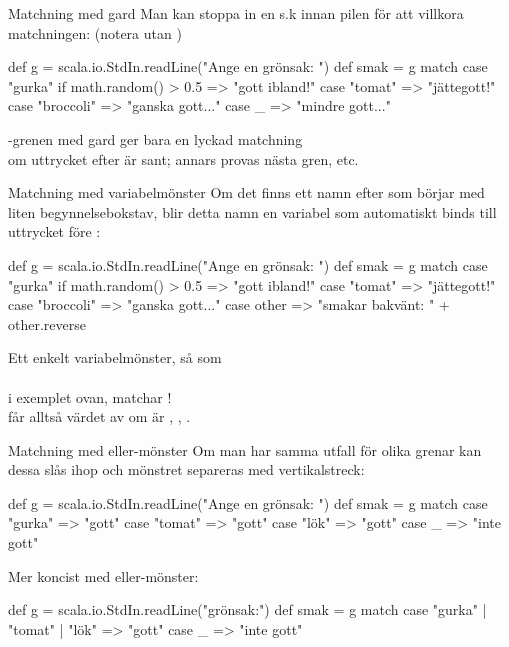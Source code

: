\begin{Slide}{Matchning med gard}
Man kan stoppa in en s.k   innan pilen \code{=>} för att villkora matchningen: (notera  utan )
\begin{Code}
def g = scala.io.StdIn.readLine("Ange en grönsak: ")
def smak = g match 
  case "gurka" if math.random() > 0.5 => "gott ibland!"
  case "tomat" => "jättegott!"
  case "broccoli" => "ganska gott..."
  case _ => "mindre gott..."
\end{Code}
-grenen med gard ger bara en lyckad matchning \\ om uttrycket efter  är sant; annars provas nästa gren, etc.
\end{Slide}

\begin{Slide}{Matchning med variabelmönster}\SlideFontSmall
Om det finns ett namn efter  som börjar med liten begynnelsebokstav, blir detta namn en variabel som automatiskt binds till uttrycket före :

\begin{Code}
def g = scala.io.StdIn.readLine("Ange en grönsak: ")
def smak = g match 
  case "gurka" if math.random() > 0.5 => "gott ibland!"
  case "tomat" => "jättegott!"
  case "broccoli" => "ganska gott..."
  case other => "smakar bakvänt: " + other.reverse
\end{Code}

Ett enkelt variabelmönster, så som \\  \\ i exemplet ovan, matchar ! \\ får alltså värdet av  om   är , , .

\end{Slide}


\begin{Slide}{Matchning med eller-mönster}\SlideFontSmall
Om man har samma utfall för olika grenar kan dessa slås ihop och mönstret separeras med vertikalstreck: \code{|}
\begin{Code}
def g = scala.io.StdIn.readLine("Ange en grönsak: ")
def smak = g match 
  case "gurka" => "gott"
  case "tomat" => "gott"
  case "lök"   => "gott"
  case _ => "inte gott"
\end{Code}

Mer koncist med eller-mönster:

\begin{Code}
def g = scala.io.StdIn.readLine("grönsak:")
def smak = g match 
  case "gurka" | "tomat" | "lök" => "gott"
  case _ => "inte gott"
\end{Code}



\end{Slide}





